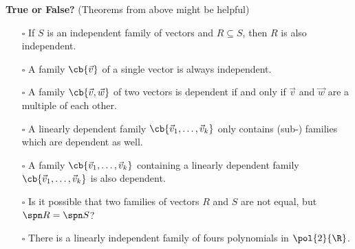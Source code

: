 \documentclass[letterpaper, 10pt]{article}
\begin{document}
\newpage
\lb
\textbf{True or False?} (Theorems from above might be helpful)
\lb
\begin{enumerate}
    \item[$\square$]
        If $S$ is an independent family of vectors and $R \subseteq S$, then
        $R$ is also independent.
    \item[$\square$]
        A family $ \cb{\vec v}$ of a single vector is always independent.
    \item[$\square$]
        A family $ \cb{\vec v, \vec w}$ of two vectors is dependent if and only if
        $\vec v$ and $\vec w$ are a multiple of each other.
    \item[$\square$]
        A linearly dependent family $ \cb{\vec v_1, \ldots, \vec v_k}$ only contains
        (sub-) families which are dependent as well.
    \item[$\square$]
        A family $ \cb{\vec v_1, \ldots, \vec v_k}$ containing a linearly dependent
        family $ \cb{\vec v_1, \ldots, \vec v_k} $ is also dependent.
    \item[$\square$]
        Is it possible that two families of vectors $R$ and $S$ are not equal, but
        $\spn R = \spn S$?
    \item[$\square$]
        There is a linearly independent family of fours polynomials in $\pol{2}{\R}$.
\end{enumerate}
\end{document}
